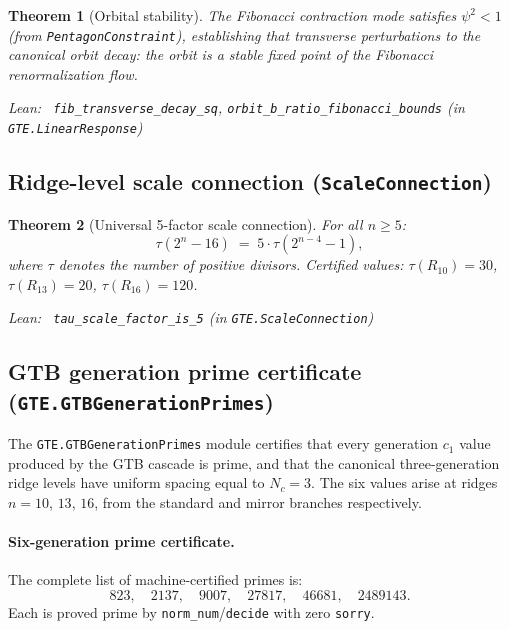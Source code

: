 \documentclass[11pt,a4paper]{article}
\newenvironment{leanref}%
  {\par\smallskip\noindent\begingroup\raggedright\textup{Lean:}~}%
  {\par\endgroup}
\newtheorem{theorem}{Theorem}[section]
\theoremstyle{definition}
\begin{document}
\begin{theorem}[Orbital stability]\label{thm:orbital-stable}
The Fibonacci contraction mode satisfies $\psi^2 < 1$ (from
\lstinline|PentagonConstraint|), establishing that transverse perturbations to the
canonical orbit decay: the orbit is a stable fixed point of the Fibonacci
renormalization flow.

\begin{leanref} \lstinline|fib_transverse_decay_sq|,
\lstinline|orbit_b_ratio_fibonacci_bounds|
\textup{(in \texttt{GTE.LinearResponse})}
\end{leanref}
\end{theorem}

\subsection{Ridge-level scale connection (\texttt{ScaleConnection})}\label{subsec:scaleconnect}

\begin{theorem}[Universal 5-factor scale connection]\label{thm:tau-scale}
For all $n \ge 5$:
\[
  \tau(2^n - 16) \;=\; 5 \cdot \tau(2^{n-4} - 1),
\]
where $\tau$ denotes the number of positive divisors.  Certified values:
$\tau(R_{10}) = 30$, $\tau(R_{13}) = 20$, $\tau(R_{16}) = 120$.

\begin{leanref} \lstinline|tau_scale_factor_is_5|
\textup{(in \texttt{GTE.ScaleConnection})}
\end{leanref}
\end{theorem}

\subsection{GTB generation prime certificate
            (\texttt{GTE.GTBGenerationPrimes})}\label{subsec:gtb-generation-primes}

The \texttt{GTE.GTBGenerationPrimes} module certifies that every generation
$c_1$ value produced by the GTB cascade is prime, and that the canonical
three-generation ridge levels have uniform spacing equal to $N_c = 3$.
The six values arise at ridges $n = 10$, $13$, $16$, from the standard
and mirror branches respectively.

\paragraph{Six-generation prime certificate.}
The complete list of machine-certified primes is:
\[
  823,\quad 2137,\quad 9007,\quad 27817,\quad 46681,\quad 2489143.
\]
Each is proved prime by \lstinline|norm_num|/\lstinline|decide| with
zero \texttt{sorry}.
\end{document}
